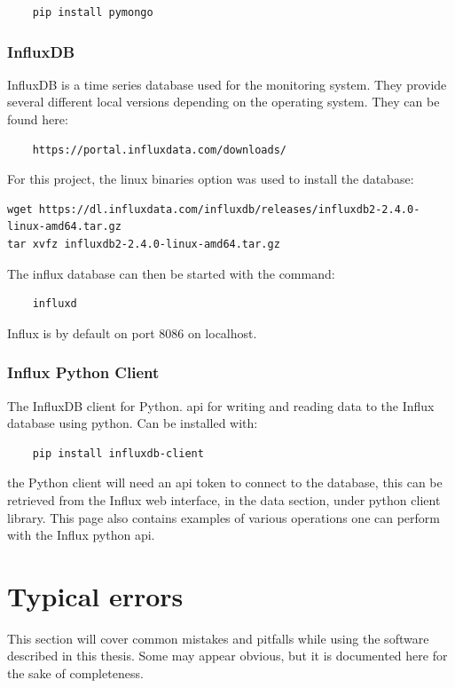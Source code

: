 \documentclass[main.tex]{subfiles}
\begin{document}
\begin{verbatim}
    pip install pymongo
\end{verbatim}

\subsubsection{InfluxDB}

InfluxDB is a time series database used for the monitoring system. They provide several different local versions depending on the operating system. They can be found here:
\begin{verbatim}
    https://portal.influxdata.com/downloads/
\end{verbatim}

For this project, the linux binaries option was used to install the database:
\begin{verbatim}
wget https://dl.influxdata.com/influxdb/releases/influxdb2-2.4.0-linux-amd64.tar.gz
tar xvfz influxdb2-2.4.0-linux-amd64.tar.gz
\end{verbatim}

The influx database can then be started with the command:

\begin{verbatim}
    influxd
\end{verbatim}

Influx is by default on port 8086 on localhost.

\subsubsection{Influx Python Client}
The InfluxDB client for Python. \gls{api} for writing and reading data to the Influx database using python. Can be installed with:

\begin{verbatim}
    pip install influxdb-client
\end{verbatim}

the Python client will need an \gls{api} token to connect to the database, this can be retrieved from the Influx web interface, in the data section, under python client library. This page also contains examples of various operations one can perform with the Influx python \gls{api}.

\section{Typical errors}

This section will cover common mistakes and pitfalls while using the software described in this thesis. Some may appear obvious, but it is documented here for the sake of completeness.
\end{document}
